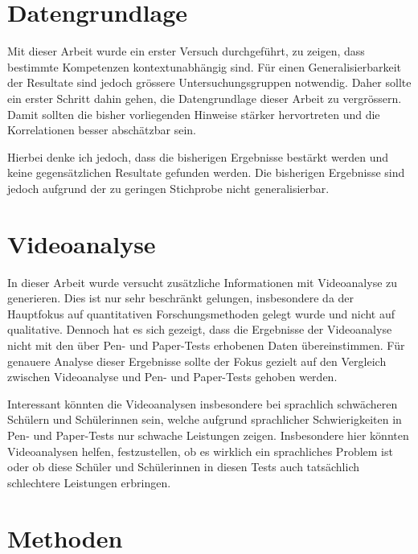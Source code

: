 \section{Datengrundlage}

Mit dieser Arbeit wurde ein erster Versuch durchgeführt, zu zeigen, dass bestimmte Kompetenzen kontextunabhängig sind. Für einen Generalisierbarkeit der Resultate sind jedoch grössere Untersuchungsgruppen notwendig. Daher sollte ein erster Schritt dahin gehen, die Datengrundlage dieser Arbeit zu vergrössern. Damit sollten die bisher vorliegenden Hinweise stärker hervortreten und die Korrelationen besser abschätzbar sein.

Hierbei denke ich jedoch, dass die bisherigen Ergebnisse bestärkt werden und keine gegensätzlichen Resultate gefunden werden. Die bisherigen Ergebnisse sind jedoch aufgrund der zu geringen Stichprobe nicht generalisierbar. 




\section{Videoanalyse}

In dieser Arbeit wurde versucht zusätzliche Informationen mit Videoanalyse zu generieren. Dies ist nur sehr beschränkt gelungen, insbesondere da der Hauptfokus auf quantitativen Forschungsmethoden gelegt wurde und nicht auf qualitative. Dennoch hat es sich gezeigt, dass die Ergebnisse der Videoanalyse nicht mit den über  Pen- und Paper-Tests erhobenen Daten übereinstimmen. Für genauere Analyse dieser Ergebnisse sollte der Fokus gezielt auf den Vergleich zwischen Videoanalyse und Pen- und Paper-Tests gehoben werden. 

Interessant könnten die Videoanalysen insbesondere bei sprachlich schwächeren Schülern und Schülerinnen sein, welche aufgrund sprachlicher Schwierigkeiten in Pen- und Paper-Tests nur schwache Leistungen zeigen. Insbesondere hier könnten Videoanalysen helfen, festzustellen, ob es wirklich ein sprachliches Problem ist oder ob diese Schüler und Schülerinnen in diesen Tests auch tatsächlich schlechtere Leistungen erbringen.

\section{Methoden}

